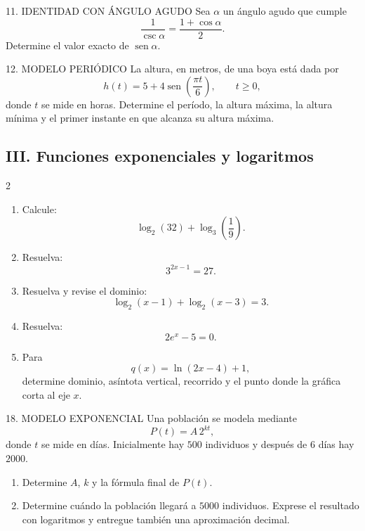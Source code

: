 \documentclass[letterpaper,12pt]{article}
\newcommand{\seno}{\operatorname{sen}}
\newcommand{\tituloSeccion}[1]{%
    \needspace{4\baselineskip}
    \subsection*{\color{azulFuerte}#1}
}
\begin{document}
\begin{ejerciciobox}{11. IDENTIDAD CON ÁNGULO AGUDO}
Sea \(\alpha\) un ángulo agudo que cumple
\[
    \frac{1}{\csc\alpha}=\frac{1+\cos\alpha}{2}.
\]
Determine el valor exacto de \(\seno\alpha\).
\end{ejerciciobox}

\begin{ejerciciobox}{12. MODELO PERIÓDICO}
La altura, en metros, de una boya está dada por
\[
    h(t)=5+4\seno\left(\frac{\pi t}{6}\right),
    \qquad t\geq0,
\]
donde \(t\) se mide en horas. Determine el período, la altura máxima, la altura mínima y el primer instante en que alcanza su altura máxima.
\end{ejerciciobox}

\tituloSeccion{III. Funciones exponenciales y logaritmos}

\begin{multicols}{2}
\begin{enumerate}[label=\color{azulFuerte}\textbf{\arabic*.},leftmargin=*,start=13,itemsep=1em]
    \item Calcule:
    \[
        \log_2(32)+\log_3\left(\frac19\right).
    \]

    \item Resuelva:
    \[
        3^{2x-1}=27.
    \]

    \item Resuelva y revise el dominio:
    \[
        \log_2(x-1)+\log_2(x-3)=3.
    \]

    \item Resuelva:
    \[
        2e^x-5=0.
    \]

    \item Para
    \[
        q(x)=\ln(2x-4)+1,
    \]
    determine dominio, asíntota vertical, recorrido y el punto donde la gráfica corta al eje \(x\).
\end{enumerate}
\end{multicols}

\begin{ejerciciobox}{18. MODELO EXPONENCIAL}
Una población se modela mediante
\[
    P(t)=A\,2^{kt},
\]
donde \(t\) se mide en días. Inicialmente hay \(500\) individuos y después de \(6\) días hay \(2000\).

\begin{enumerate}[label=\alph*),leftmargin=*]
    \item Determine \(A\), \(k\) y la fórmula final de \(P(t)\).
    \item Determine cuándo la población llegará a \(5000\) individuos. Exprese el resultado con logaritmos y entregue también una aproximación decimal.
\end{enumerate}
\end{ejerciciobox}
\end{document}

